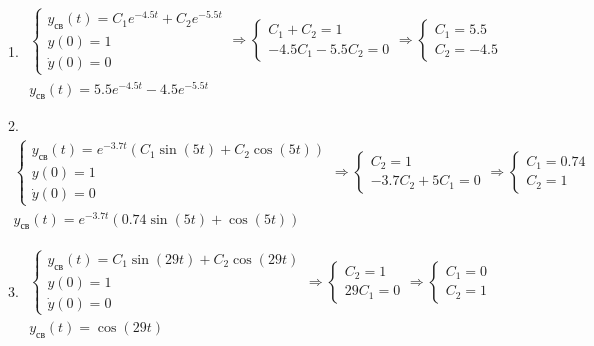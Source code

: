 1. $\begin{array}{l}
\left\lbrace \begin{array}{c}
y_{св} (t)=C_1 e^{-4.5t} +C_2 e^{-5.5t} \\
y(0)=1\\
\dot{y} (0)=0
\end{array}\right.\Rightarrow \left\lbrace \begin{array}{c}
C_1 +C_2 =1\\
-4.5C_1 -5.5C_2 =0
\end{array}\right.\Rightarrow \left\lbrace \begin{array}{c}
C_1 =5.5\\
C_2 =-4.5
\end{array}\right.\\
y_{св} (t)=5.5e^{-4.5t} -4.5e^{-5.5t} 
\end{array}$

\vspace{1em}

2. $\begin{array}{l}
\left\lbrace \begin{array}{c}
y_{\textrm{св}} (t)=e^{-3.7t} (C_1 \sin (5t)+C_2 \cos (5t))\\
y(0)=1\\
\dot{y} (0)=0
\end{array}\right.\Rightarrow \left\lbrace \begin{array}{c}
C_2 =1\\
-3.7C_2 +5C_1 =0
\end{array}\right.\Rightarrow \left\lbrace \begin{array}{c}
C_1 =0.74\\
C_2 =1
\end{array}\right.\\
y_{\textrm{св}} (t)=e^{-3.7t} (0.74\sin (5t)+\cos (5t))
\end{array}$

\vspace{1em}

3. $\begin{array}{l}
\left\lbrace \begin{array}{c}
y_{св} (t)=C_1 \sin (29t)+C_2 \cos (29t)\\
y(0)=1\\
\dot{y} (0)=0
\end{array}\right.\Rightarrow \left\lbrace \begin{array}{c}
C_2 =1\\
29C_1 =0
\end{array}\right.\Rightarrow \left\lbrace \begin{array}{c}
C_1 =0\\
C_2 =1
\end{array}\right.\\
y_{\textrm{св}} (t)=\cos (29t)
\end{array}$

